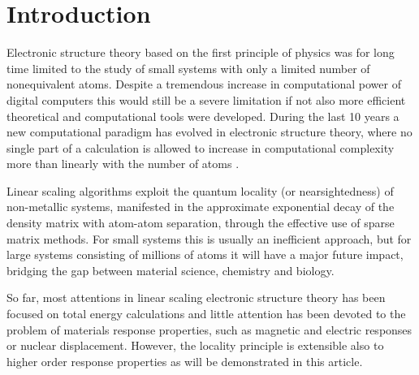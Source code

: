 \documentclass[prl,aps,twocolumn,showpacs,twocolumngrid,superbib]{revtex4}
\begin{document}
\section{Introduction}
 Electronic structure theory based on the first principle 
 of physics was for long time limited to the study of small
 systems with only a limited number of nonequivalent atoms. 
 Despite a tremendous increase in computational power
 of digital computers this would still be a severe limitation
 if not also more efficient theoretical and computational
 tools were developed. During the last 10 years a new computational 
 paradigm has evolved in electronic structure theory, where
 no single part of a calculation is allowed to increase in 
 computational complexity more than linearly with the number
 of atoms \cite{ON_Reviews}. 

 Linear scaling algorithms exploit the quantum locality 
 (or nearsightedness) of non-metallic systems, 
 manifested in the approximate exponential decay of the density matrix 
 with atom-atom separation, through the effective use of sparse 
 matrix methods. For small systems this is usually an inefficient
 approach, but for large systems consisting of millions
 of atoms it will have a major future impact, bridging the gap
 between material science, chemistry and biology. 

 So far, most attentions in linear scaling electronic structure
 theory has been focused on total energy calculations and little
 attention has been devoted to the problem of materials response
 properties, such as magnetic and electric responses or nuclear
 displacement. However, the locality principle is extensible
 also to higher order response properties as will be demonstrated
 in this article.

\end{document}
